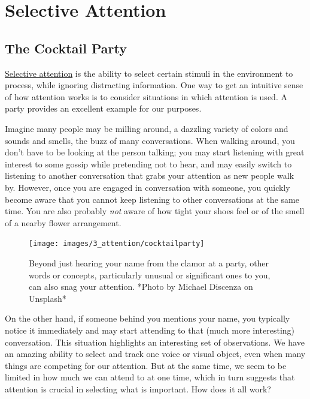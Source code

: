 \documentclass[
]{krantz}
\begin{document}
\section{Selective Attention}\label{selective-attention}

\subsection*{The Cocktail Party}\label{the-cocktail-party}


\hyperref[selective-attention]{Selective attention} is the ability to select certain stimuli in the environment to process, while ignoring distracting information. One way to get an intuitive sense of how attention works is to consider situations in which attention is used. A party provides an excellent example for our purposes.

Imagine many people may be milling around, a dazzling variety of colors and sounds and smells, the buzz of many conversations. When walking around, you don't have to be looking at the person talking; you may start listening with great interest to some gossip while pretending not to hear, and may easily switch to listening to another conversation that grabs your attention as new people walk by. However, once you are engaged in conversation with someone, you quickly become aware that you cannot keep listening to other conversations at the same time. You are also probably \emph{not} aware of how tight your shoes feel or of the smell of a nearby flower arrangement.

\begin{figure}

{\centering \texttt{[image: images/3\_attention/cocktailparty]} 

}

\caption{Beyond just hearing your name from the clamor at a party, other words or concepts, particularly unusual or significant ones to you, can also snag your attention. *Photo by Michael Discenza on Unsplash*}\label{fig:cocktailparty}
\end{figure}

On the other hand, if someone behind you mentions your name, you typically notice it immediately and may start attending to that (much more interesting) conversation. This situation highlights an interesting set of observations. We have an amazing ability to select and track one voice or visual object, even when many things are competing for our attention. But at the same time, we seem to be limited in how much we can attend to at one time, which in turn suggests that attention is crucial in selecting what is important. How does it all work?
\end{document}

